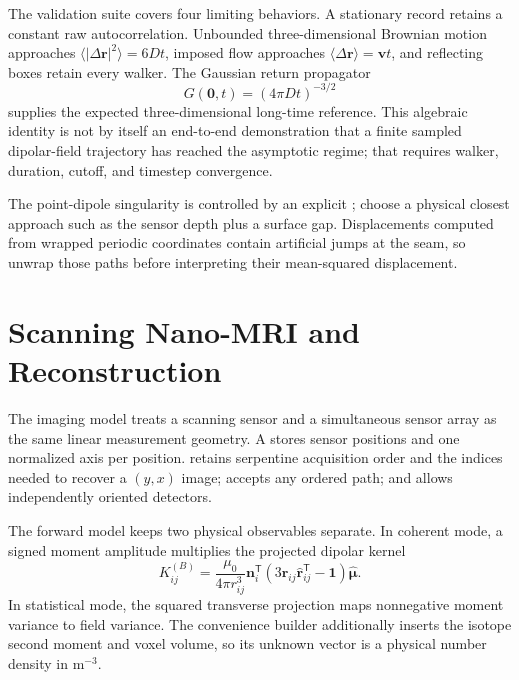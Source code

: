 The validation suite covers four limiting behaviors. A stationary record
retains a constant raw autocorrelation. Unbounded three-dimensional Brownian
motion approaches
\(\langle|\Delta\mathbf r|^2\rangle=6Dt\), imposed flow approaches
\(\langle\Delta\mathbf r\rangle=\mathbf vt\), and reflecting boxes retain
every walker. The Gaussian return propagator
\[
  G(\mathbf 0,t)=(4\pi Dt)^{-3/2}
\]
supplies the expected three-dimensional long-time reference. This algebraic identity is not by itself an end-to-end demonstration that a finite sampled dipolar-field trajectory has reached the asymptotic regime; that requires walker, duration, cutoff, and timestep convergence.

The point-dipole singularity is controlled by an explicit
; choose a physical closest approach such as the
sensor depth plus a surface gap. Displacements computed from wrapped periodic
coordinates contain artificial jumps at the seam, so unwrap those paths
before interpreting their mean-squared displacement.

\section{Scanning Nano-MRI and Reconstruction}

The imaging model treats a scanning sensor and a simultaneous sensor array as the same
linear measurement geometry. A  stores sensor positions and
one normalized axis per position.  retains serpentine
acquisition order and the indices needed to recover a \((y,x)\) image;
 accepts any ordered path; and 
allows independently oriented detectors.

The forward model keeps two physical observables separate. In coherent
 mode, a signed moment amplitude multiplies the projected dipolar
kernel
\[
  K_{ij}^{(B)}
  =\frac{\mu_0}{4\pi r_{ij}^3}
   \mathbf n_i^{\mathsf T}
   (3\hat{\mathbf r}_{ij}\hat{\mathbf r}_{ij}^{\mathsf T}-\mathbf 1)
   \hat{\boldsymbol{\mu}} .
\]
In statistical  mode, the squared transverse
projection maps nonnegative moment variance to field variance. The convenience
builder  additionally inserts
the isotope second moment and voxel volume, so its unknown vector is a
physical number density in \(\mathrm{m^{-3}}\).

